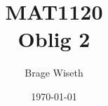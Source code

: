 \documentclass{article}%
\title{MAT1120\\Oblig 2}%
\author{Brage Wiseth}%
\date{\today}%
\begin{document}
%
\normalsize%
\maketitle%








\end{document}
